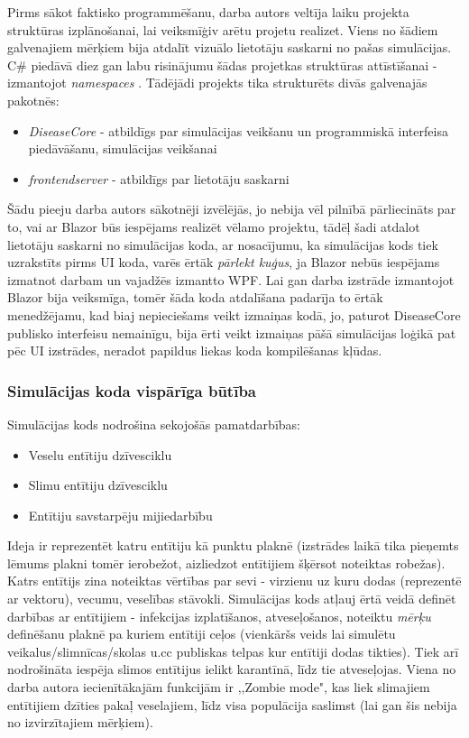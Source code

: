 Pirms sākot faktisko programmēšanu, darba autors veltīja laiku projekta
struktūras izplānošanai, lai veiksmīģiv arētu projetu realizet. Viens no šādiem
galvenajiem mērķiem bija atdalīt vizuālo lietotāju saskarni no pašas simulācijas.
C\# piedāvā diez gan labu risinājumu šādas projetkas struktūras attīstīšanai - izmantojot
\emph{namespaces} \cite{csharp:namespaces}. Tādējādi projekts tika strukturēts
divās galvenajās pakotnēs:

\begin{itemize}
    \item \emph{DiseaseCore} - atbildīgs par simulācijas veikšanu un programmiskā
        interfeisa piedāvāšanu, simulācijas veikšanai
    \item \emph{frontendserver} - atbildīgs par lietotāju saskarni
\end{itemize}

Šādu pieeju darba autors sākotnēji izvēlējās, jo nebija vēl pilnībā pārliecināts
par to, vai ar Blazor būs iespējams realizēt vēlamo projektu, tādēļ šadi atdalot
lietotāju saskarni no simulācijas koda, ar nosacījumu, ka simulācijas kods tiek
uzrakstīts pirms UI koda, varēs ērtāk \emph{pārlekt kuģus}, ja Blazor nebūs
iespējams izmatnot darbam un vajadžēs izmantto WPF. Lai gan darba izstrāde
izmantojot Blazor bija veiksmīga, tomēr šāda koda atdalīšana padarīja to ērtāk
menedžējamu, kad biaj nepieciešams veikt izmaiņas kodā, jo, paturot DiseaseCore
publisko interfeisu nemainīgu, bija ērti veikt izmaiņas pāšā simulācijas loģikā
pat pēc UI izstrādes, neradot papildus liekas koda kompilēšanas kļūdas.

\subsubsection*{Simulācijas koda vispārīga būtība}

Simulācijas kods nodrošina sekojošās pamatdarbības:

\begin{itemize}
    \item Veselu entītiju dzīvesciklu
    \item Slimu entītiju dzīvesciklu
    \item Entītiju savstarpēju mijiedarbību
\end{itemize}

Ideja ir reprezentēt katru entītiju kā punktu plaknē (izstrādes
laikā tika pieņemts lēmums plakni tomēr ierobežot, aizliedzot entītijiem šķērsot
noteiktas robežas). Katrs entītijs zina noteiktas vērtības par sevi - virzienu
uz kuru dodas (reprezentē ar vektoru), vecumu, veselības stāvokli. Simulācijas
kods atļauj ērtā veidā definēt darbības ar entītijiem - infekcijas izplatīšanos,
atveseļošanos, noteiktu \emph{mērķu} definēšanu plaknē pa kuriem entītiji ceļos
(vienkāršs veids lai simulētu veikalus/slimnīcas/skolas u.cc publiskas telpas
kur entītiji dodas tikties). Tiek arī nodrošināta iespēja slimos entītijus
ielikt karantīnā, līdz tie atveseļojas. Viena no darba autora iecienītākajām
funkcijām ir ,,Zombie mode", kas liek slimajiem entītijiem dzīties
pakaļ veselajiem, līdz visa populācija saslimst (lai gan šis nebija no izvirzītajiem mērķiem).

